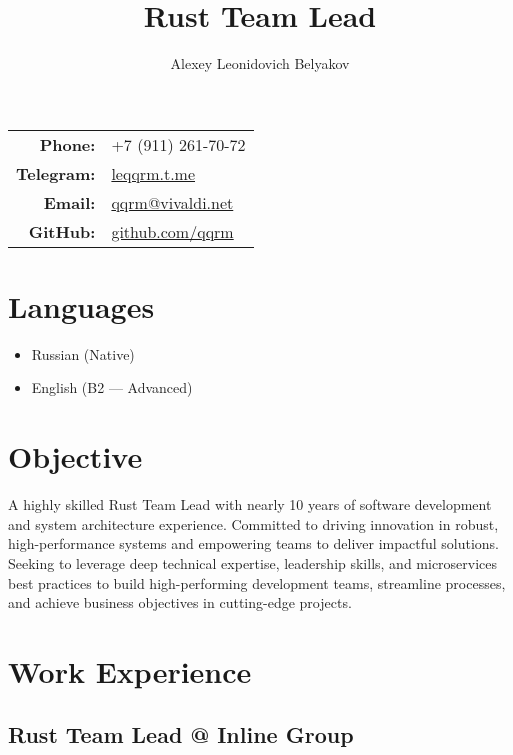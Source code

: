 \documentclass[a4paper,12pt]{article}
\title{\textbf{Rust Team Lead}}
\author{Alexey Leonidovich Belyakov}
\begin{document}
\maketitle

\begin{center}
    \begin{tabular}{rl}
        \textbf{Phone:} & +7 (911) 261-70-72 \\
        \textbf{Telegram:} & \href{https://leqqrm.t.me}{leqqrm.t.me} \\
        \textbf{Email:} & \href{mailto:qqrm@vivaldi.net}{qqrm@vivaldi.net} \\
        \textbf{GitHub:} & \href{https://github.com/qqrm}{github.com/qqrm} \\
    \end{tabular}
\end{center}

\vspace{5mm}

\section*{Languages}
\begin{itemize}[leftmargin=15pt]
    \item Russian (Native)
    \item English (B2 — Advanced)
\end{itemize}

\section*{Objective}
A highly skilled Rust Team Lead with nearly 10 years of software development and system architecture experience. Committed to driving innovation in robust, high-performance systems and empowering teams to deliver impactful solutions. Seeking to leverage deep technical expertise, leadership skills, and microservices best practices to build high-performing development teams, streamline processes, and achieve business objectives in cutting-edge projects.

\section*{Work Experience}

\subsection*{Rust Team Lead @ Inline Group}
\end{document}
